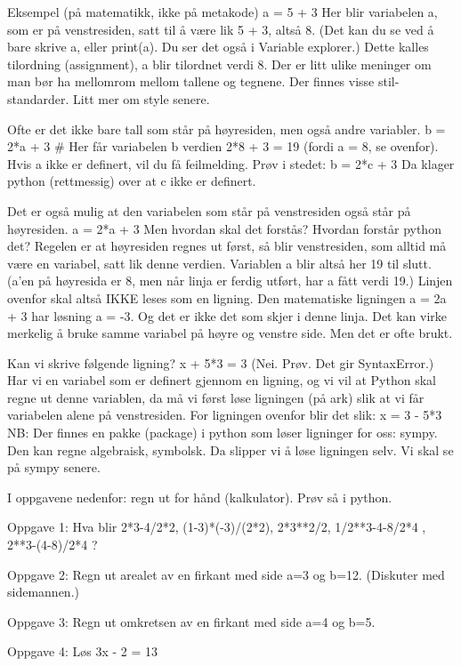 Eksempel (på matematikk, ikke på metakode)
a = 5 + 3
Her blir variabelen a, som er på venstresiden, satt til å være lik 5 + 3, altså 8. 
(Det kan du se ved å bare skrive a, eller print(a). Du ser det også i Variable explorer.) 
Dette kalles tilordning (assignment), a blir tilordnet verdi 8.
Der er litt ulike meninger om man bør ha mellomrom mellom tallene og tegnene.
Der finnes visse stil-standarder. Litt mer om style senere. 

Ofte er det ikke bare tall som står på høyresiden, men også andre variabler. 
b = 2*a + 3  # Her får variabelen b verdien 2*8 + 3 = 19  (fordi a = 8, se ovenfor).
Hvis a ikke er definert, vil du få feilmelding. 
Prøv i stedet: 
b = 2*c + 3 
Da klager python (rettmessig) over at c ikke er definert. 

Det er også mulig at den variabelen som står på venstresiden også står på høyresiden.
a = 2*a + 3
Men hvordan skal det forstås? Hvordan forstår python det? 
Regelen er at høyresiden regnes ut først, så blir venstresiden,
som alltid må være en variabel, satt lik denne verdien. 
Variablen a blir altså her 19 til slutt.
(a'en på høyresida er 8, men når linja er ferdig utført, har a fått verdi 19.)  
Linjen ovenfor skal altså IKKE leses som en ligning.
Den matematiske ligningen a = 2a + 3 har løsning a = -3.
Og det er ikke det som skjer i denne linja. 
Det kan virke merkelig å bruke samme variabel på høyre og venstre side.
Men det er ofte brukt. 

Kan vi skrive følgende ligning? 
x + 5*3 = 3
(Nei. Prøv. Det gir SyntaxError.) 
Har vi en variabel som er definert gjennom en ligning,
og vi vil at Python skal regne ut denne variablen,
da må vi først løse ligningen (på ark) slik at vi får variabelen alene på venstresiden.
For ligningen ovenfor blir det slik: 
x = 3 - 5*3
NB: Der finnes en pakke (package) i python som løser ligninger for oss: sympy. 
Den kan regne algebraisk, symbolsk. 
Da slipper vi å løse ligningen selv.
Vi skal se på sympy senere. 


I oppgavene nedenfor: regn ut for hånd (kalkulator). Prøv så i python. 

Oppgave 1:
Hva blir 2*3-4/2*2, (1-3)*(-3)/(2*2), 2*3**2/2, 1/2**3-4-8/2*4 , 2**3-(4-8)/2*4 ?  

Oppgave 2:
Regn ut arealet av en firkant med side a=3 og b=12. (Diskuter med sidemannen.) 

Oppgave 3: Regn ut omkretsen av en firkant med side a=4 og b=5.

Oppgave 4: Løs 3x - 2 = 13 

